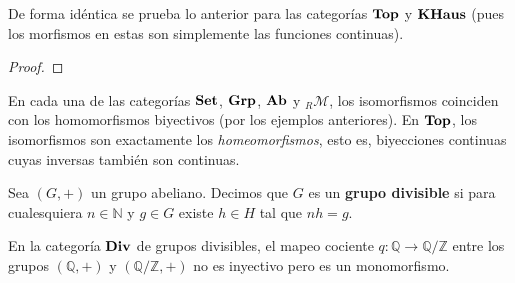 \documentclass[12pt]{report}
\theoremstyle{largebreak}
\newcommand\cf[3]{\ensuremath{#1:#2\rightarrow#3}}
\newcommand{\Cat}[1]{\ensuremath{\textup{\textbf{#1}}}}
\begin{document}
    De forma idéntica se prueba lo anterior para las categorías $\Cat{Top}$ y $\Cat{KHaus}$ (pues los morfismos en estas son simplemente las funciones continuas).

    \begin{exa}
        
    \end{exa}

    \begin{proof}
        
    \end{proof}

    \begin{exa}
        En cada una de las categorías $\Cat{Set}$, $\Cat{Grp}$, $\Cat{Ab}$ y $_R\mathcal{M}$, los isomorfismos coinciden con los homomorfismos biyectivos (por los ejemplos anteriores). En $\Cat{Top}$, los isomorfismos son exactamente los \textit{homeomorfismos}, esto es, biyecciones continuas cuyas inversas también son continuas.
    \end{exa}

    \begin{mydef}
        Sea $(G,+)$ un grupo abeliano. Decimos que $G$ es un \textbf{grupo divisible} si para cualesquiera $n\in\mathbb{N}$ y $g\in G$ existe $h\in H$ tal que $nh=g$.
    \end{mydef}

    \begin{exa}
        En la categoría $\Cat{Div}$ de grupos divisibles, el mapeo cociente $\cf{q}{\mathbb{Q}}{\mathbb{Q}/\mathbb{Z}}$ entre los grupos $(\mathbb{Q},+)$ y $(\mathbb{Q}/\mathbb{Z},+)$ no es inyectivo pero es un monomorfismo.
    \end{exa}
\end{document}
